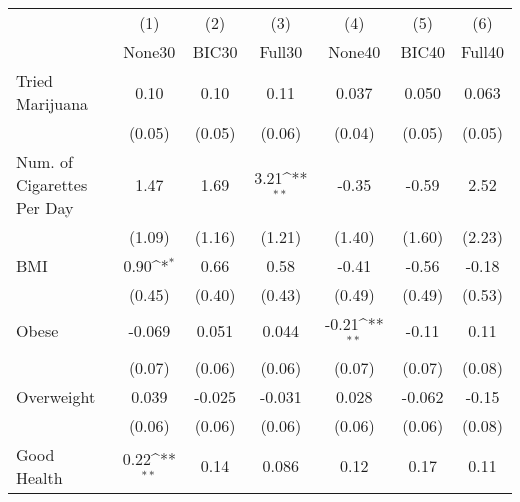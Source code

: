 {
\def\sym#1{\ifmmode^{#1}\else\(^{#1}\)\fi}
\begin{tabular}{l*{6}{c}}
\toprule
            &\multicolumn{1}{c}{(1)}&\multicolumn{1}{c}{(2)}&\multicolumn{1}{c}{(3)}&\multicolumn{1}{c}{(4)}&\multicolumn{1}{c}{(5)}&\multicolumn{1}{c}{(6)}\\
            &\multicolumn{1}{c}{None30}&\multicolumn{1}{c}{BIC30}&\multicolumn{1}{c}{Full30}&\multicolumn{1}{c}{None40}&\multicolumn{1}{c}{BIC40}&\multicolumn{1}{c}{Full40}\\
\midrule
Tried Marijuana&        0.10         &        0.10         &        0.11         &       0.037         &       0.050         &       0.063         \\
            &      (0.05)         &      (0.05)         &      (0.06)         &      (0.04)         &      (0.05)         &      (0.05)         \\
\addlinespace
Num. of Cigarettes Per Day&        1.47         &        1.69         &        3.21\sym{**} &       -0.35         &       -0.59         &        2.52         \\
            &      (1.09)         &      (1.16)         &      (1.21)         &      (1.40)         &      (1.60)         &      (2.23)         \\
\addlinespace
BMI         &        0.90\sym{*}  &        0.66         &        0.58         &       -0.41         &       -0.56         &       -0.18         \\
            &      (0.45)         &      (0.40)         &      (0.43)         &      (0.49)         &      (0.49)         &      (0.53)         \\
\addlinespace
Obese       &      -0.069         &       0.051         &       0.044         &       -0.21\sym{**} &       -0.11         &        0.11         \\
            &      (0.07)         &      (0.06)         &      (0.06)         &      (0.07)         &      (0.07)         &      (0.08)         \\
\addlinespace
Overweight  &       0.039         &      -0.025         &      -0.031         &       0.028         &      -0.062         &       -0.15         \\
            &      (0.06)         &      (0.06)         &      (0.06)         &      (0.06)         &      (0.06)         &      (0.08)         \\
\addlinespace
Good Health &        0.22\sym{**} &        0.14         &       0.086         &        0.12         &        0.17         &        0.11         \\

\end{tabular}}
